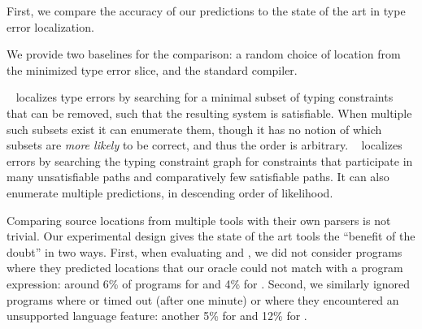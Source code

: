 \label{sec:quantitative}

First, we compare the accuracy of our predictions to the
state of the art in type error localization.

We provide two baselines for the comparison: a random choice of location
from the minimized type error slice, and the standard \ocaml compiler.

\mycroft~\citep{Loncaric2016-uk} localizes type errors by searching for
a minimal subset of typing constraints that can be removed, such that
the resulting system is satisfiable.
%
When multiple such subsets exist it can enumerate them, though it has no
notion of which subsets are \emph{more likely} to be correct, and thus
the order is arbitrary.
%
\sherrloc~\citep{Zhang2014-lv} localizes errors by searching the typing
constraint graph for constraints that participate in many unsatisfiable
paths and comparatively few satisfiable paths.
%
It can also enumerate multiple predictions, in descending order of
likelihood.

Comparing source locations from multiple tools with their own parsers is
not trivial.
%
Our experimental design gives the state of the art tools the ``benefit
of the doubt'' in two ways.
First, when evaluating \mycroft and \sherrloc, we did not consider
programs where they predicted locations that our oracle could not match
with a program expression: around 6\% of programs for \mycroft and 4\%
for \sherrloc.
%
Second, we similarly ignored programs where \mycroft or \sherrloc timed
out (after one minute) or where they encountered an unsupported language
feature: another 5\% for \mycroft and 12\% for \sherrloc.
%

